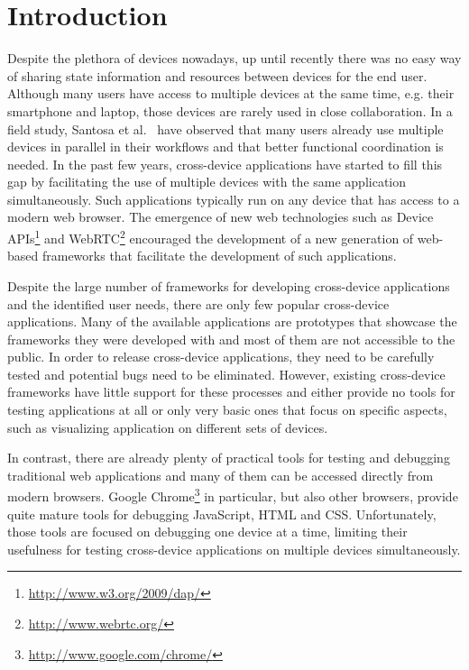 \chapter{Introduction}

Despite the plethora of devices nowadays, up until recently there was no easy way of sharing state information and resources between devices for the end user. Although many users have access to multiple devices at the same time, e.g. their smartphone and laptop, those devices are rarely used in close collaboration. In a field study, Santosa et al.~\cite{santosa2013} have observed that many users already use multiple devices in parallel in their workflows and that better functional coordination is needed. In the past few years, cross-device applications have started to fill this gap by facilitating the use of multiple devices with the same application simultaneously. Such applications typically run on any device that has access to a modern web browser. The emergence of new web technologies such as Device APIs\footnote{\url{http://www.w3.org/2009/dap/}} and WebRTC\footnote{\url{http://www.webrtc.org/}} encouraged the development of a new generation of web-based frameworks that facilitate the development of such applications.

Despite the large number of frameworks for developing cross-device applications and the identified user needs, there are only few popular cross-device applications. Many of the available applications are prototypes that showcase the frameworks they were developed with and most of them are not accessible to the public. In order to release cross-device applications, they need to be carefully tested and potential bugs need to be eliminated. However, existing cross-device frameworks have little support for these processes and either provide no tools for testing applications at all or only very basic ones that focus on specific aspects, such as visualizing application on different sets of devices.

In contrast, there are already plenty of practical tools for testing and debugging traditional web applications and many of them can be accessed directly from modern browsers. Google Chrome\footnote{\url{http://www.google.com/chrome/}} in particular, but also other browsers, provide quite mature tools for debugging JavaScript, HTML and CSS. Unfortunately, those tools are focused on debugging one device at a time, limiting their usefulness for testing cross-device applications on multiple devices simultaneously. 

